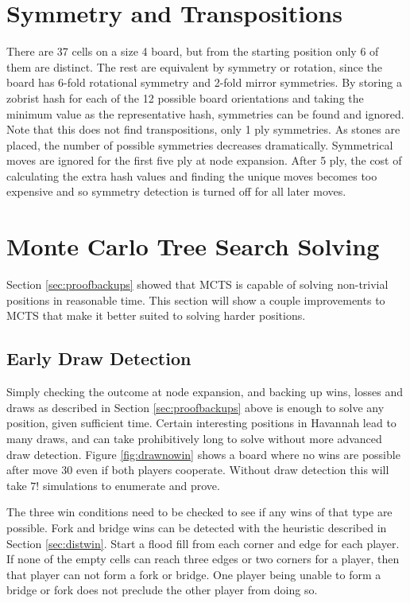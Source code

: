 

\section{Symmetry and Transpositions}


There are 37 cells on a size 4 board, but from the starting position only 6 of them are distinct. The rest are equivalent by symmetry or rotation, since the board has 6-fold rotational symmetry and 2-fold mirror symmetries. By storing a zobrist hash for each of the 12 possible board orientations and taking the minimum value as the representative hash, symmetries can be found and ignored. Note that this does not find transpositions, only 1 ply symmetries. As stones are placed, the number of possible symmetries decreases dramatically. Symmetrical moves are ignored for the first five ply at node expansion. After 5 ply, the cost of calculating the extra hash values and finding the unique moves becomes too expensive and so symmetry detection is turned off for all later moves.


\section{Monte Carlo Tree Search Solving}

Section \ref{sec:proofbackups} showed that MCTS is capable of solving non-trivial positions in reasonable time. This section will show a couple improvements to MCTS that make it better suited to solving harder positions.

\subsection{Early Draw Detection}

Simply checking the outcome at node expansion, and backing up wins, losses and draws as described in Section \ref{sec:proofbackups} above is enough to solve any position, given sufficient time. Certain interesting positions in Havannah lead to many draws, and can take prohibitively long to solve without more advanced draw detection. Figure \ref{fig:drawnowin} shows a board where no wins are possible after move 30 even if both players cooperate. Without draw detection this will take $7!$ simulations to enumerate and prove.

The three win conditions need to be checked to see if any wins of that type are possible. Fork and bridge wins can be detected with the heuristic described in Section \ref{sec:distwin}. Start a flood fill from each corner and edge for each player. If none of the empty cells can reach three edges or two corners for a player, then that player can not form a fork or bridge. One player being unable to form a bridge or fork does not preclude the other player from doing so.

